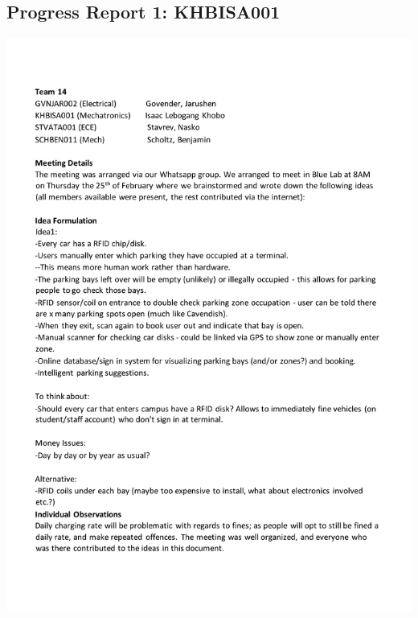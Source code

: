 \subsection*{Progress Report 1: KHBISA001}
\includegraphics[scale=0.9]{meeting/report1-isaac.pdf}

\newpage
